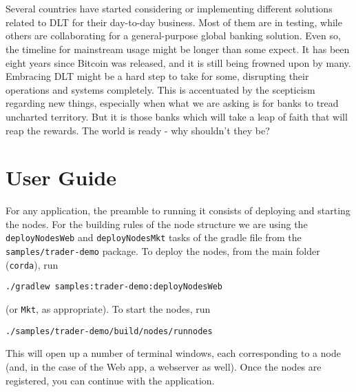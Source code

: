 \documentclass[12pt,twoside]{article}
\begin{document}
\\ \\
Several countries have started considering or implementing different solutions related to DLT for their day-to-day business. Most of them are in testing, while others are collaborating for a general-purpose global banking solution. Even so, the timeline for mainstream usage might be longer than some expect. It has been eight years since Bitcoin was released, and it is still being frowned upon by many. Embracing DLT might be a hard step to take for some, disrupting their operations and systems completely. This is accentuated by the scepticism regarding new things, especially when what we are asking is for banks to tread uncharted territory. But it is those banks which will take a leap of faith that will reap the rewards. The world is ready - why shouldn't they be?





\newpage


\newpage
\section*{User Guide} 
\label{sec:UG}
For any application, the preamble to running it consists of deploying and starting the nodes. For the building rules of the node structure we are using the \verb|deployNodesWeb| and \verb|deployNodesMkt| tasks of the gradle file from the \verb|samples/trader-demo| package. To deploy the nodes, from the main folder (\verb|corda|), run 
\begin{center}
\verb|./gradlew samples:trader-demo:deployNodesWeb|
\end{center}
(or \verb|Mkt|, as appropriate). To start the nodes, run
\begin{center}
\verb|./samples/trader-demo/build/nodes/runnodes|
\end{center}
This will open up a number of terminal windows, each corresponding to a node (and, in the case of the Web app, a webserver as well). Once the nodes are registered, you can continue with the application.
\end{document}
